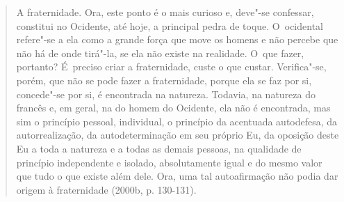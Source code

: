 \begin{quote}
A fraternidade. Ora, este ponto é o mais curioso e, deve"-se confessar,
constitui no Ocidente, até hoje, a principal pedra de toque. O~ocidental
refere"-se a ela como a grande força que move os homens e não percebe que
não há de onde tirá"-la, se ela não existe na realidade. O~que fazer,
portanto? É~preciso criar a fraternidade, custe o que custar.
Verifica"-se, porém, que não se pode fazer a fraternidade, porque ela se
faz por si, concede"-se por si, é encontrada na natureza. Todavia, na
natureza do francês e, em geral, na do homem do Ocidente, ela não é
encontrada, mas sim o princípio pessoal, individual, o princípio da
acentuada autodefesa, da autorrealização, da autodeterminação em seu
próprio Eu, da oposição deste Eu a toda a natureza e a todas as demais
pessoas, na qualidade de princípio independente e isolado, absolutamente
igual e do mesmo valor que tudo o que existe além dele. Ora, uma tal
autoafirmação não podia dar origem à fraternidade (2000b, p. 130-131).
\end{quote}

